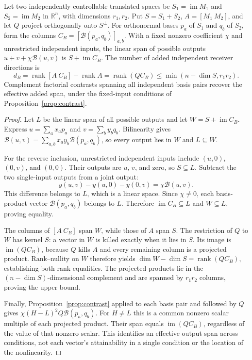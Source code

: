 \documentclass[submission,nolinenumbers]{esj}
\newcommand{\R}{\mathbb R}
\newcommand{\Bmap}{\mathcal{B}}
\DeclareMathOperator{\im}{im}
\DeclareMathOperator{\rank}{rank}
\begin{document}
\begin{proposition}\label{prop:innovation}
Let two independently controllable translated spaces be $S_1=\im M_1$ and $S_2=\im M_2$ in $\R^n$, with dimensions $r_1,r_2$. Put $S=S_1+S_2$, $A=[M_1\ M_2]$, and let $Q$ project orthogonally onto $S^\perp$. For orthonormal bases $p_a$ of $S_1$ and $q_b$ of $S_2$, form the columns $C_B=[\Bmap(p_a,q_b)]_{a,b}$. With a fixed nonzero coefficient $\chi$ and unrestricted independent inputs, the linear span of possible outputs $u+v+\chi\Bmap(u,v)$ is $S+\im C_B$. The number of added independent receiver directions is
\begin{equation}
d_B=\rank[A\ C_B]-\rank A=\rank(QC_B)
\le\min(n-\dim S,r_1r_2).\label{eq:innovationrank}
\end{equation}
Complement factorial contrasts spanning all independent basis pairs recover the effective added span, under the fixed-input conditions of Proposition~\ref{prop:contrast}.
\end{proposition}
\begin{proof}
Let $L$ be the linear span of all possible outputs and let $W=S+\im C_B$. Express $u=\sum_a x_ap_a$ and $v=\sum_b y_bq_b$. Bilinearity gives $\Bmap(u,v)=\sum_{a,b}x_ay_b\Bmap(p_a,q_b)$, so every output lies in $W$ and $L\subseteq W$.

For the reverse inclusion, unrestricted independent inputs include $(u,0)$, $(0,v)$, and $(0,0)$. Their outputs are $u$, $v$, and zero, so $S\subseteq L$. Subtract the two single-input outputs from a joint output:
\[
y(u,v)-y(u,0)-y(0,v)=\chi\Bmap(u,v).
\]
This difference belongs to $L$, which is a linear space. Since $\chi\ne0$, each basis-product vector $\Bmap(p_a,q_b)$ belongs to $L$. Therefore $\im C_B\subseteq L$ and $W\subseteq L$, proving equality.

The columns of $[A\ C_B]$ span $W$, while those of $A$ span $S$. The restriction of $Q$ to $W$ has kernel $S$: a vector in $W$ is killed exactly when it lies in $S$. Its image is $\im(QC_B)$, because $Q$ kills $A$ and every remaining column is a projected product. Rank--nullity on $W$ therefore yields $\dim W-\dim S=\rank(QC_B)$, establishing both rank equalities. The projected products lie in the $(n-\dim S)$-dimensional complement and are spanned by $r_1r_2$ columns, proving the upper bound.

Finally, Proposition~\ref{prop:contrast} applied to each basis pair and followed by $Q$ gives $\chi(H-L)^2Q\Bmap(p_a,q_b)$. For $H\ne L$ this is a common nonzero scalar multiple of each projected product. Their span equals $\im(QC_B)$, regardless of the value of that nonzero scalar. This identifies an effective output span across conditions, not each vector's attainability in a single condition or the location of the nonlinearity.
\end{proof}
\end{document}
